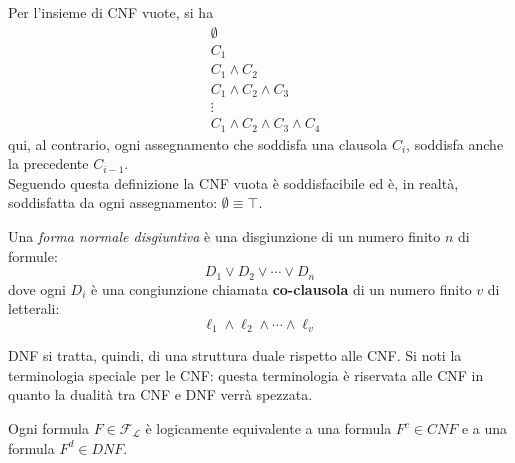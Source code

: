 Per l'insieme di CNF vuote, si ha 
\begin{align*}
& \emptyset \\
& C_1 \\
& C_1 \land C_2 \\
& C_1 \land C_2 \land C_3\\
& \vdots \\
& C_1 \land C_2 \land C_3 \land C_4
\end{align*}
qui, al contrario, ogni assegnamento che soddisfa una clausola $C_i$, soddisfa anche la precedente $C_{i-1}$. \\
Seguendo questa definizione la CNF vuota è soddisfacibile ed è, in realtà, soddisfatta da ogni assegnamento: $\emptyset \equiv \top$. 

\begin{defi}
Una \textit{forma normale disgiuntiva} è una disgiunzione di un numero finito $n$ di formule:
$$
D_1 \lor D_2 \lor \cdots \lor D_n
$$
dove ogni $D_i$ è una congiunzione chiamata \textbf{co-clausola} di un numero finito $v$ di letterali:
$$
\ell_1 \land \ell_2 \land \cdots \land \ell_v
$$
\end{defi}

DNF si tratta, quindi, di una struttura duale rispetto alle CNF.
Si noti la terminologia speciale per le CNF: questa terminologia è riservata alle CNF in quanto la dualità tra CNF e DNF verrà spezzata. 

\begin{lem}
Ogni formula $F \in \mathscr{F_L}$ è logicamente equivalente a una formula $F^c \in CNF$ 
e a una formula $F^d \in DNF$.
\end{lem}

